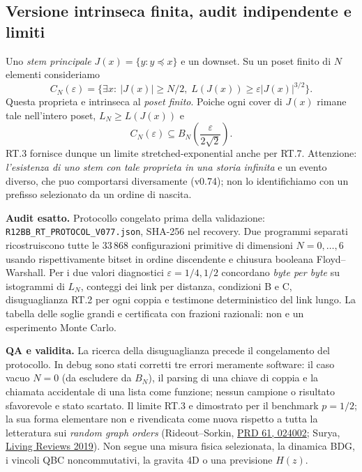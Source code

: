 \documentclass[11pt,a4paper]{article}
\begin{document}
\subsection*{Versione intrinseca finita, audit indipendente e limiti}
Uno \emph{stem principale} $J(x)=\{y:y\preceq x\}$ e un downset. Su un poset finito di $N$ elementi consideriamo
\begin{equation}
 C_N(\varepsilon)=\{\exists x:\ |J(x)|\ge N/2,\;
 L(J(x))\ge\varepsilon |J(x)|^{3/2}\}.\tag{RT.7}
\end{equation}
Questa proprieta e intrinseca al \emph{poset finito}. Poiche ogni cover di $J(x)$ rimane tale nell'intero poset, $L_N\ge L(J(x))$ e
\begin{equation}
 \boxed{C_N(\varepsilon)\subseteq B_N\left(\frac{\varepsilon}{2\sqrt2}\right).}\tag{RT.8}
\end{equation}
RT.3 fornisce dunque un limite stretched-exponential anche per RT.7. Attenzione: \emph{l'esistenza di uno stem con tale proprieta in una storia infinita} e un evento diverso, che puo comportarsi diversamente (v0.74); non lo identifichiamo con un prefisso selezionato da un ordine di nascita.

\textbf{Audit esatto.} Protocollo congelato prima della validazione: 
\texttt{R12BB\_RT\_PROTOCOL\_V077.json}, SHA-256 nel recovery. Due programmi separati ricostruiscono tutte le $33\,868$ configurazioni primitive di dimensioni $N=0,\ldots,6$ usando rispettivamente bitset in ordine discendente e chiusura booleana Floyd--Warshall. Per i due valori diagnostici $\varepsilon=1/4,1/2$ concordano \emph{byte per byte} su istogrammi di $L_N$, conteggi dei link per distanza, condizioni B e C, disuguaglianza RT.2 per ogni coppia e testimone deterministico del link lungo. La tabella delle soglie grandi e certificata con frazioni razionali: non e un esperimento Monte Carlo.

\textbf{QA e validita.} La ricerca della disuguaglianza precede il congelamento del protocollo. In debug sono stati corretti tre errori meramente software: il caso vacuo $N=0$ (da escludere da $B_N$), il parsing di una chiave di coppia e la chiamata accidentale di una lista come funzione; nessun campione o risultato sfavorevole e stato scartato. Il limite RT.3 e dimostrato per il benchmark $p=1/2$; la sua forma elementare non e rivendicata come nuova rispetto a tutta la letteratura sui \emph{random graph orders} (Rideout--Sorkin, \href{https://doi.org/10.1103/PhysRevD.61.024002}{PRD 61, 024002}; Surya, \href{https://doi.org/10.1007/s41114-019-0023-1}{Living Reviews 2019}). Non segue una misura fisica selezionata, la dinamica BDG, i vincoli QBC noncommutativi, la gravita 4D o una previsione $H(z)$.
\end{document}
